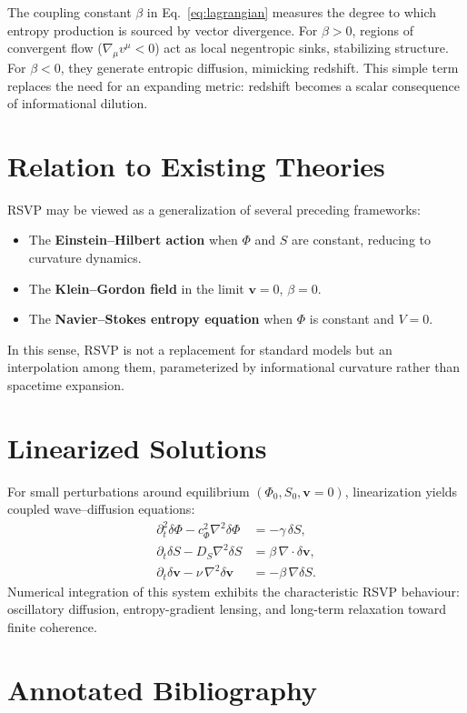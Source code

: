 \documentclass[12pt]{article}
\begin{document}
The coupling constant $\beta$ in Eq.~\eqref{eq:lagrangian} measures the degree to which entropy production is sourced by vector divergence.
For $\beta > 0$, regions of convergent flow ($\nabla_\mu v^\mu < 0$) act as local negentropic sinks, stabilizing structure.
For $\beta < 0$, they generate entropic diffusion, mimicking redshift.
This simple term replaces the need for an expanding metric: redshift becomes a scalar consequence of informational dilution.

\section{Relation to Existing Theories}

RSVP may be viewed as a generalization of several preceding frameworks:
\begin{itemize}
\item The \textbf{Einstein--Hilbert action} when $\Phi$ and $S$ are constant, reducing to curvature dynamics.
\item The \textbf{Klein--Gordon field} in the limit $\mathbf{v}\!=\!0$, $\beta\!=\!0$.
\item The \textbf{Navier--Stokes entropy equation} when $\Phi$ is constant and $V\!=\!0$.
\end{itemize}
In this sense, RSVP is not a replacement for standard models but an interpolation among them, parameterized by informational curvature rather than spacetime expansion.

\section{Linearized Solutions}

For small perturbations around equilibrium $(\Phi_0, S_0, \mathbf{v}=0)$, linearization yields coupled wave--diffusion equations:
\begin{align}
\partial_t^2 \delta \Phi - c_\Phi^2 \nabla^2 \delta \Phi &= -\gamma\,\delta S,\\
\partial_t \delta S - D_S \nabla^2 \delta S &= \beta\, \nabla\!\cdot\!\delta \mathbf{v},\\
\partial_t \delta \mathbf{v} - \nu\,\nabla^2 \delta \mathbf{v} &= -\beta\,\nabla \delta S.
\end{align}
Numerical integration of this system exhibits the characteristic RSVP behaviour:  
oscillatory diffusion, entropy-gradient lensing, and long-term relaxation toward finite coherence.

\section{Annotated Bibliography}
\end{document}
